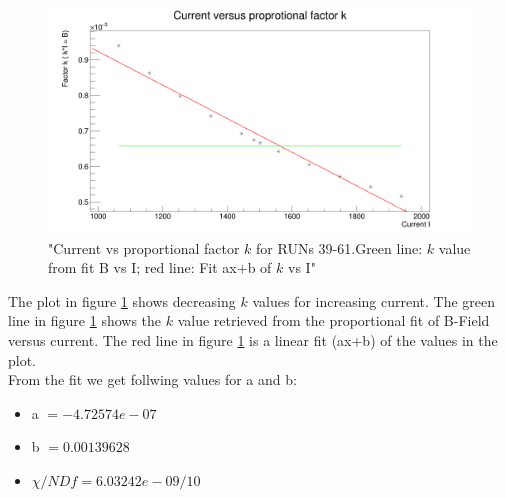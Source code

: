 \documentclass[12pt, letterpaper]{article}
\begin{document}
\begin{figure}[!htbp]
	\centering
	\includegraphics[width=.9\linewidth]{k_factor.png}
	\caption{"Current vs proportional factor $k$ for RUNs 39-61.Green line: $k$ value from fit B vs I; red line: Fit ax+b of $k$ vs I"}
	\label{fig:k_vs_i}
\end{figure}

The plot in figure \ref{fig:k_vs_i} shows decreasing $k$ values for increasing current. The green line in figure \ref{fig:k_vs_i} shows the $k$ value retrieved from the proportional fit of B-Field versus current. The red line in figure \ref{fig:k_vs_i} is a linear fit (ax+b) of the values in the plot.\\
From the fit we get follwing values for a and b:\\
\begin{itemize}
\item a $= -4.72574e-07$
\item b $= 0.00139628$
\item $\chi/NDf = 6.03242e-09/10$
\end{itemize}
\end{document}
